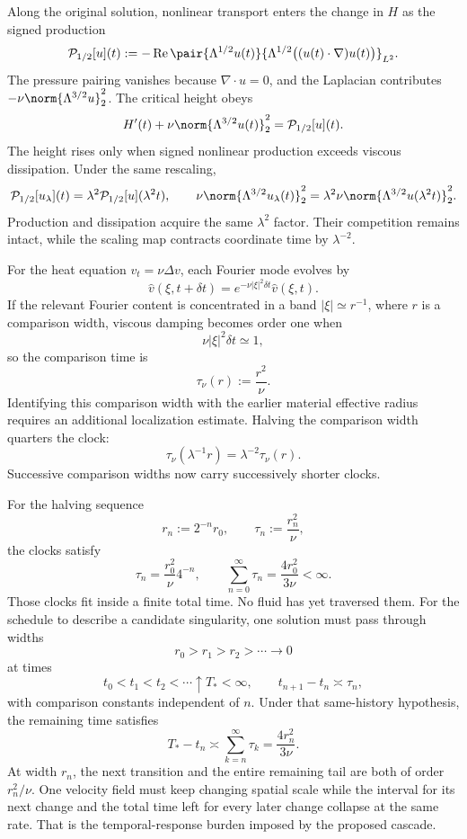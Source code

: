 
Along the original solution, nonlinear transport enters the change in \(H\) as the signed production
\[
  \mathcal P_{1/2}[u](t)
  :=
  -\operatorname{Re}
  \pair
    {\Lambda^{1/2}u(t)}
    {\Lambda^{1/2}\bigl((u(t)\cdot\nabla)u(t)\bigr)}_{L^2}.
\]
The pressure pairing vanishes because \(\nabla\cdot u=0\), and the Laplacian contributes \(-\nu\norm{\Lambda^{3/2}u}_2^2\). The critical height obeys
\[
  H'(t)
  +
  \nu\norm{\Lambda^{3/2}u(t)}_2^2
  =
  \mathcal P_{1/2}[u](t).
\]
The height rises only when signed nonlinear production exceeds viscous dissipation. Under the same rescaling,
\[
  \mathcal P_{1/2}[u_\lambda](t)
  =
  \lambda^2\mathcal P_{1/2}[u](\lambda^2t),
  \qquad
  \nu\norm{\Lambda^{3/2}u_\lambda(t)}_2^2
  =
  \lambda^2\nu\norm{\Lambda^{3/2}u(\lambda^2t)}_2^2.
\]
Production and dissipation acquire the same \(\lambda^2\) factor. Their competition remains intact, while the scaling map contracts coordinate time by \(\lambda^{-2}\).


For the heat equation \(v_t=\nu\Delta v\), each Fourier mode evolves by
\[
  \widehat v(\xi,t+\delta t)
  =
  e^{-\nu|\xi|^2\delta t}\widehat v(\xi,t).
\]
If the relevant Fourier content is concentrated in a band \(|\xi|\simeq r^{-1}\), where \(r\) is a comparison width, viscous damping becomes order one when
\[
  \nu|\xi|^2\delta t\simeq1,
\]
so the comparison time is
\[
  \tau_\nu(r)
  :=
  \frac{r^2}{\nu}.
\]
Identifying this comparison width with the earlier material effective radius requires an additional localization estimate. Halving the comparison width quarters the clock:
\[
  \tau_\nu(\lambda^{-1}r)
  =
  \lambda^{-2}\tau_\nu(r).
\]
Successive comparison widths now carry successively shorter clocks.


For the halving sequence
\[
  r_n:=2^{-n}r_0,
  \qquad
  \tau_n:=\frac{r_n^2}{\nu},
\]
the clocks satisfy
\[
  \tau_n
  =
  \frac{r_0^2}{\nu}4^{-n},
  \qquad
  \sum_{n=0}^{\infty}\tau_n
  =
  \frac{4r_0^2}{3\nu}
  <
  \infty.
\]
Those clocks fit inside a finite total time. No fluid has yet traversed them. For the schedule to describe a candidate singularity, one \NavierStokes{} solution must pass through widths
\[
  r_0>r_1>r_2>\cdots\longrightarrow0
\]
at times
\[
  t_0<t_1<t_2<\cdots\uparrow T_*<\infty,
  \qquad
  t_{n+1}-t_n\asymp\tau_n,
\]
with comparison constants independent of \(n\). Under that same-history hypothesis, the remaining time satisfies
\[
  T_*-t_n
  \asymp
  \sum_{k=n}^{\infty}\tau_k
  =
  \frac{4r_n^2}{3\nu}.
\]
At width \(r_n\), the next transition and the entire remaining tail are both of order \(r_n^2/\nu\). One velocity field must keep changing spatial scale while the interval for its next change and the total time left for every later change collapse at the same rate. That is the temporal-response burden imposed by the proposed cascade.
